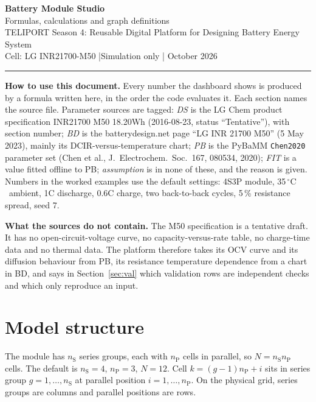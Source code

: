 \documentclass[11pt,a4paper]{article}
\newcommand{\degC}{\ensuremath{{}^{\circ}\mathrm{C}}}
\newcommand{\nS}{n_{\mathrm{S}}}
\newcommand{\nP}{n_{\mathrm{P}}}
\begin{document}
\begin{center}
{\LARGE\bfseries\color{ink} Battery Module Studio}\\[0.4em]
{\Large\color{accent} Formulas, calculations and graph definitions}\\[0.6em]
{\small TELIPORT Season 4: Reusable Digital Platform for Designing Battery Energy System\\
Cell: LG INR21700-M50 \quad|\quad Simulation only \quad| October 2026}
\end{center}

\vspace{0.4em}
\hrule
\vspace{0.6em}

\textbf{How to use this document.} Every number the dashboard shows is produced by a formula written here, in the order the code evaluates it. Each section names the source file. Parameter sources are tagged: \emph{DS} is the LG Chem product specification INR21700 M50 18.20Wh (2016-08-23, status ``Tentative''), with section number; \emph{BD} is the batterydesign.net page ``LG INR 21700 M50'' (5 May 2023), mainly its DCIR-versus-temperature chart; \emph{PB} is the PyBaMM \texttt{Chen2020} parameter set (Chen et al., J.~Electrochem.~Soc.~167, 080534, 2020); \emph{FIT} is a value fitted offline to PB; \emph{assumption} is in none of these, and the reason is given. Numbers in the worked examples use the default settings: 4S3P module, 35\,\degC\ ambient, 1C discharge, 0.6C charge, two back-to-back cycles, 5\,\% resistance spread, seed 7.

\textbf{What the sources do not contain.} The M50 specification is a tentative draft. It has no open-circuit-voltage curve, no capacity-versus-rate table, no charge-time data and no thermal data. The platform therefore takes its OCV curve and its diffusion behaviour from PB, its resistance temperature dependence from a chart in BD, and says in Section~\ref{sec:val} which validation rows are independent checks and which only reproduce an input.

\tableofcontents

\section{Model structure}
The module has $\nS$ series groups, each with $\nP$ cells in parallel, so $N=\nS\nP$ cells. The default is $\nS=4$, $\nP=3$, $N=12$. Cell $k=(g-1)\nP+i$ sits in series group $g=1,\dots,\nS$ at parallel position $i=1,\dots,\nP$. On the physical grid, series groups are columns and parallel positions are rows.
\end{document}
